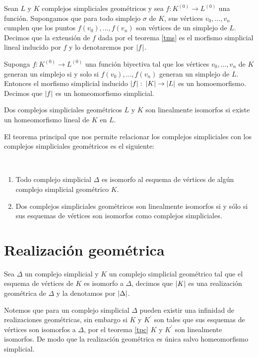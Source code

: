 \begin{Defi}
Sean $L$ y $K$ complejos simpliciales geométricos y sea $f\colon K^{(0)} \rightarrow L^{(0)}$ una función. Supongamos que  para todo simplejo $\sigma$ de $K$, sus vértices $v_0,\ldots,v_n$ cumplen que los puntos $f(v_0),\ldots,f(v_n)$ son vértices de un simplejo de $L$. Decimos que la extensión de $f$ dada por el teorema \ref{tms} es el morfismo simplicial lineal inducido por $f$ y lo denotaremos por $\left| f \right|$.
\end{Defi}
\begin{Teo}
Suponga $f:K^{(0)}\rightarrow L^{(0)}$ una función biyectiva tal que los vértices $v_0,\ldots,v_n$ de $K$ generan un simplejo si y solo si $f(v_0),\ldots,f(v_n)$ generan un simplejo de $L$. Entonces el morfismo simplicial inducido $\left| f \right|\colon \left| K \right|\rightarrow\left| L \right|$ es un homoemorfismo. Decimos que $\left| f \right|$ es un homeomorfismo simplicial.
\end{Teo}
\begin{Defi}
Dos complejos simpliciales geométricos $L$ y $K$ son linealmente isomorfos si existe un homeomorfismo lineal de $K$ en $L$.
\end{Defi}
El teorema principal que nos permite relacionar los complejos simpliciales con los complejos simpliciales geométricos es el siguiente:
\begin{Teo}\label{tpc} 
~\begin{enumerate}
\item Todo complejo simplicial $\mathcal{\Delta}$ es isomorfo al esquema de vértices de algún complejo simplicial geométrico $K$.
\item Dos complejos simpliciales geométricos son linealmente isomorfos si y sólo si sus esquemas de vértices son isomorfos como complejos simpliciales.
\end{enumerate}
\end{Teo}

\section{Realización geométrica}
\begin{Defi}
Sea $\Delta$ un complejo simplicial y $K$ un complejo simplicial geométrico tal que el esquema de vértices de $K$ es isomorfo a $\Delta$, decimos que $\left| K \right|$ es una realización geométrica de $\Delta$ y la denotamos por $\left| \Delta \right|$.
\end{Defi}
Notemos que para un complejo simplicial $\Delta$ pueden existir una infinidad de realizaciones geométricas, sin embargo si $K$ y $K^{'}$ son tales que sus esquemas de vértices son isomorfos a $\Delta$, por el teorema \ref{tpc} $K$ y $K^{'}$ son linealmente isomorfos. De modo que la realización geométrica es única salvo homeomorfismo simplicial.

